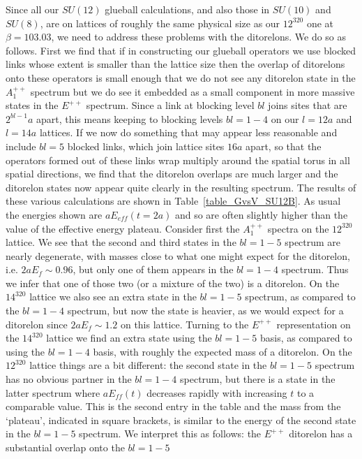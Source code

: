 \documentclass[12pt]{article}
\begin{document}
Since all our $SU(12)$ glueball calculations, and also those in $SU(10)$ and $SU(8)$,
are on lattices of roughly the same physical size as our $12^320$ one at $\beta=103.03$, we need
to address these problems with the ditorelons. We do so as follows. First we find that
if in constructing our glueball operators we use blocked links whose extent is smaller than
the lattice size then the overlap of ditorelons onto these operators is small enough that
we do not see any ditorelon state in the $A_1^{++}$ spectrum but we do see it embedded as a
small component in more massive states in the $E^{++}$ spectrum. Since a link at blocking level
$bl$ joins sites that are $2^{bl-1}a$ apart, this means keeping to blocking levels $bl=1-4$
on our $l=12a$ and $l=14a$ lattices. If we now do something that may appear less reasonable and
include $bl=5$ blocked links, which join lattice sites $16a$ apart, so that the operators
formed out of these links wrap multiply around the spatial torus in all spatial directions,
we find that the ditorelon overlaps are much larger and the ditorelon states now appear quite
clearly in the resulting spectrum. The results of these various calculations
are shown in Table~\ref{table_GvsV_SU12B}. As usual the energies shown are $aE_{eff}(t=2a)$
and so are often slightly higher than the value of the effective energy plateau.
Consider first the $A_1^{++}$ spectra on the $12^320$ lattice. We see that the second and third
states in the $bl=1-5$ spectrum are nearly degenerate, with masses close to what one might
expect for the ditorelon, i.e. $2aE_f\sim 0.96$, but only one of them appears in the $bl=1-4$
spectrum. Thus we infer that one of those two (or a mixture of the two) is a ditorelon.
On the $14^320$ lattice we also see an extra state in the $bl=1-5$ spectrum, as compared
to the $bl=1-4$ spectrum, but now the state is heavier, as we would expect for a ditorelon 
since  $2aE_f\sim 1.2$ on this lattice. Turning to the $E^{++}$ representation on the $14^320$
lattice we find an extra state using the $bl=1-5$ basis, as compared to using the $bl=1-4$ basis,
with roughly the expected mass of a ditorelon.
On the  $12^320$ lattice things are a bit different: the second state in the $bl=1-5$ spectrum
has no obvious partner in the $bl=1-4$ spectrum, but there is a state in the latter spectrum
where $aE_{ff}(t)$ decreases rapidly with increasing $t$ to a comparable value. This is
the second entry in the table and the mass from the `plateau', indicated in square brackets,
is similar to the energy of the second state in the $bl=1-5$ spectrum. We
interpret this as follows: the $E^{++}$ ditorelon has a substantial overlap onto the $bl=1-5$
\end{document}
